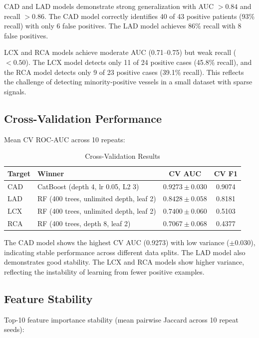 \documentclass[conference]{IEEEtran}
\begin{document}
CAD and LAD models demonstrate strong generalization with AUC $> 0.84$ and recall $> 0.86$. The CAD model correctly identifies 40 of 43 positive patients (93\% recall) with only 6 false positives. The LAD model achieves 86\% recall with 8 false positives.

LCX and RCA models achieve moderate AUC (0.71--0.75) but weak recall ($< 0.50$). The LCX model detects only 11 of 24 positive cases (45.8\% recall), and the RCA model detects only 9 of 23 positive cases (39.1\% recall). This reflects the challenge of detecting minority-positive vessels in a small dataset with sparse signals.

\subsection{Cross-Validation Performance}

Mean CV ROC-AUC across 10 repeats:

\begin{table}[htbp]
\centering
\caption{Cross-Validation Results}
\label{tab:cv}
\footnotesize
\setlength{\tabcolsep}{3pt}
\begin{tabular}{lp{1.45in}cc}
\toprule
\textbf{Target} & \textbf{Winner} & \textbf{CV AUC} & \textbf{CV F1} \\
\midrule
CAD & CatBoost (depth 4, lr 0.05, L2 3) & $0.9273 \pm 0.030$ & 0.9074 \\
LAD & RF (400 trees, unlimited depth, leaf 2) & $0.8428 \pm 0.058$ & 0.8181 \\
LCX & RF (400 trees, unlimited depth, leaf 2) & $0.7400 \pm 0.060$ & 0.5103 \\
RCA & RF (400 trees, depth 8, leaf 2) & $0.7067 \pm 0.068$ & 0.4377 \\
\bottomrule
\end{tabular}
\end{table}

The CAD model shows the highest CV AUC (0.9273) with low variance ($\pm 0.030$), indicating stable performance across different data splits. The LAD model also demonstrates good stability. The LCX and RCA models show higher variance, reflecting the instability of learning from fewer positive examples.

\subsection{Feature Stability}

Top-10 feature importance stability (mean pairwise Jaccard across 10 repeat seeds):
\end{document}
